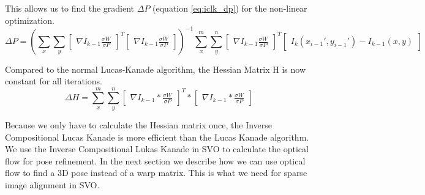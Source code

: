 \documentclass[11pt,a4paper,titlepage,oneside]{report}
\begin{document}
This allows us to find the gradient $\Delta P$ (equation \ref{eq:iclk_dp}) for the non-linear optimization.
\tiny
\begin{equation}\label{eq:iclk_dp}
  \Delta P=(\sum_x\sum_y\begin{bmatrix}\nabla I_{k-1}\frac{\sigma W}{\sigma P}\end{bmatrix}^T\begin{bmatrix}\nabla I_{k-1}\frac{\sigma W}{\sigma P}\end{bmatrix})^{-1}
  \sum_x^m\sum_y^n\begin{bmatrix}\nabla I_{k-1}\frac{\sigma W}{\sigma P}\end{bmatrix}^T\begin{bmatrix}I_{k}(x_{i-1}',y_{i-1}') - I_{k-1}(x,y)\end{bmatrix}
\end{equation}
\normalsize

Compared to the normal Lucas-Kanade algorithm, the Hessian Matrix H is now constant for all iterations.
\begin{equation}
  \Delta H=\sum_x^m\sum_y^n\begin{bmatrix}\nabla I_{k-1}*\frac{\sigma W}{\sigma P}\end{bmatrix}^T*\begin{bmatrix}\nabla I_{k-1}*\frac{\sigma W}{\sigma P}\end{bmatrix}
\end{equation}

Because we only have to calculate the Hessian matrix once, the Inverse Compositional Lucas Kanade is more efficient than the Lucas Kanade algorithm.\\
We use the Inverse Compositional Lukas Kanade in SVO to calculate the optical flow for pose refinement. In the next section we describe how we can use optical flow to find a 3D pose instead of a warp matrix. This is what we need for sparse image alignment in SVO.
\end{document}
